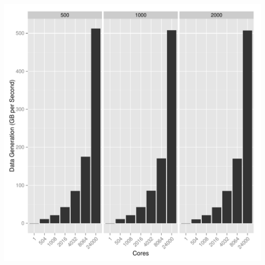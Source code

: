 \begin{frame}
  \begin{block}{}
  \begin{center}
    \includegraphics[height=.88\textheight]{../common/pics/datagen}
  \end{center}
  \end{block}
\end{frame}


